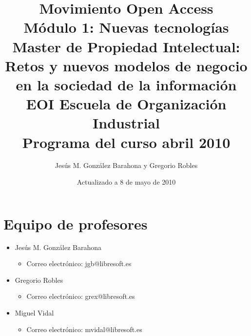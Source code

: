 \documentclass[a4paper,12pt]{article}
\title{Movimiento Open Access \\
Módulo 1: Nuevas tecnologías \\
Master de Propiedad Intelectual: \\
Retos y nuevos modelos de negocio en la sociedad de la información \\
EOI Escuela de Organización Industrial \\
Programa del curso abril 2010}
\author{Jesús M. González Barahona y Gregorio Robles}
\date{Actualizado a 8 de mayo de 2010}
\begin{document}
\maketitle

\newpage

\tableofcontents

\newpage

\section{Equipo de profesores}

\begin{itemize}
\item Jesús M. González Barahona
  \begin{itemize}
  \item Correo electrónico: jgb@libresoft.es
  \end{itemize}
\item Gregorio Robles
  \begin{itemize}
  \item Correo electrónico: grex@libresoft.es
  \end{itemize}
\item Miguel Vidal
  \begin{itemize}
  \item Correo electrónico: mvidal@libresoft.es
  \end{itemize}
\end{itemize}





\end{document}
